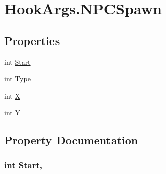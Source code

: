 \hypertarget{structOTA_1_1Plugin_1_1HookArgs_1_1NPCSpawn}{}\section{Hook\+Args.\+N\+P\+C\+Spawn}
\label{structOTA_1_1Plugin_1_1HookArgs_1_1NPCSpawn}
\subsection*{Properties}
\begin{DoxyCompactItemize}
\item 
int \hyperlink{structOTA_1_1Plugin_1_1HookArgs_1_1NPCSpawn_a0b2c355629c0c41a383ab8db641304ee}{Start}
\item 
int \hyperlink{structOTA_1_1Plugin_1_1HookArgs_1_1NPCSpawn_ae011432eaca3858364b05a111f4011d3}{Type}
\item 
int \hyperlink{structOTA_1_1Plugin_1_1HookArgs_1_1NPCSpawn_a80c0944640e62d3ed6c5419c1bcc0c88}{X}
\item 
int \hyperlink{structOTA_1_1Plugin_1_1HookArgs_1_1NPCSpawn_aa482c4cc86a24474e4fb19b5b5978778}{Y}
\end{DoxyCompactItemize}


\subsection{Property Documentation}
\hypertarget{structOTA_1_1Plugin_1_1HookArgs_1_1NPCSpawn_a0b2c355629c0c41a383ab8db641304ee}{}
\subsubsection[{Start}]{\setlength{\rightskip}{0pt plus 5cm}int Start\hspace{0.3cm}{\ttfamily [get]}, {\ttfamily [set]}}\label{structOTA_1_1Plugin_1_1HookArgs_1_1NPCSpawn_a0b2c355629c0c41a383ab8db641304ee}
\hypertarget{structOTA_1_1Plugin_1_1HookArgs_1_1NPCSpawn_ae011432eaca3858364b05a111f4011d3}{}
